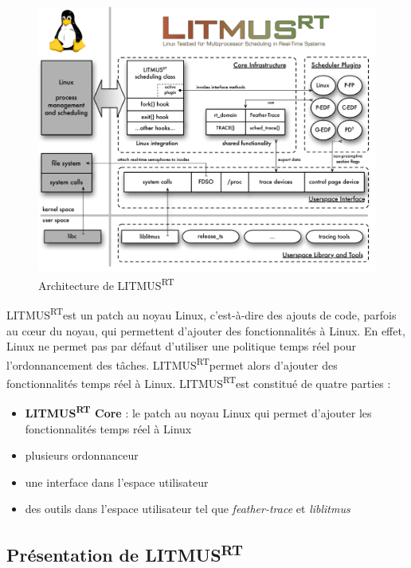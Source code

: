 \documentclass{article}
\newcommand{\litmus}{LITMUS\textsuperscript{RT}}
\begin{document}
\begin{figure}[H]
    \centering
    \includegraphics[width=0.5\paperwidth]{Images/litmusrtarchitecture.png}
    \caption{Architecture de \litmus}
    \label{fig:litmusrtarchitecture}
\end{figure}

    \litmus est un patch au noyau Linux, c'est-à-dire des ajouts de code, parfois au cœur du noyau, qui permettent d'ajouter des fonctionnalités à Linux. En effet, Linux ne permet pas par défaut d'utiliser une politique temps réel pour l'ordonnancement des tâches. \litmus permet alors d'ajouter des fonctionnalités temps réel à Linux. \litmus est constitué de quatre parties : 
    \begin{itemize}
        \item \textbf{LITMUS\textsuperscript{RT} Core} : le patch au noyau Linux qui permet d'ajouter les fonctionnalités temps réel à Linux
        \item plusieurs \gls{ordonnanceur}
        \item une interface dans l'espace utilisateur
        \item des outils dans l'espace utilisateur tel que \textit{feather-trace} et \textit{liblitmus}
    \end{itemize}


    \subsection{Présentation de \litmus}
    
    
\end{document}
